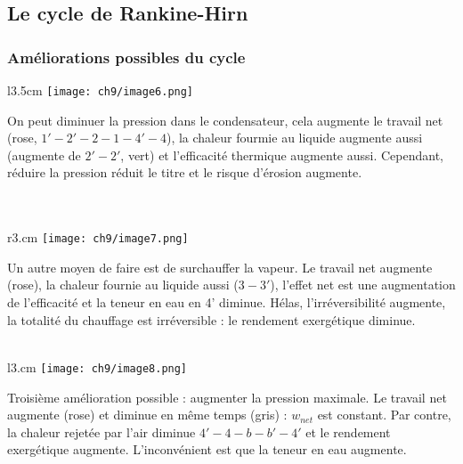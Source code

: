 	\subsection{Le cycle de Rankine-Hirn}
		\subsubsection{Améliorations possibles du cycle}
		\begin{wrapfigure}[8]{l}{3.5cm}
		\vspace{-5mm}
		\texttt{[image: ch9/image6.png]}
		\end{wrapfigure}
		On peut diminuer la pression dans le condensateur, cela augmente le 
		travail net (rose, $1'-2'-2-1-4'-4$), la chaleur fourmie au liquide 
		augmente aussi (augmente de $2'-2'$, vert) et l'efficacité thermique 
		augmente aussi. Cependant, réduire la pression réduit le titre et le 
		risque d'érosion augmente.\\\\
		\\
		
		
		\begin{wrapfigure}[8]{r}{3.cm}
		\vspace{-15mm}
		\texttt{[image: ch9/image7.png]}
		\end{wrapfigure}
		Un autre moyen de faire est de surchauffer la vapeur. Le travail net 
		augmente (rose), la chaleur fournie au liquide aussi ($3-3'$), l'effet 
		net est une augmentation de l’efficacité et la teneur en eau en 4' 
		diminue. Hélas, l'irréversibilité augmente, la totalité du chauffage 
		est irréversible : le rendement exergétique diminue.\\\\
		
		
		\begin{wrapfigure}[7]{l}{3.cm}
		\vspace{-8mm}
		\texttt{[image: ch9/image8.png]}
		\end{wrapfigure}		
		Troisième amélioration possible : augmenter la pression maximale. Le 
		travail net augmente (rose) et diminue en même temps (gris) : $w_{net}$ 
		est constant. Par contre, la chaleur rejetée par l'air diminue $4'-4-b
		-b'-4'$ et le rendement exergétique augmente. L'inconvénient est que la 
		teneur en eau augmente.\\
		\\
		
